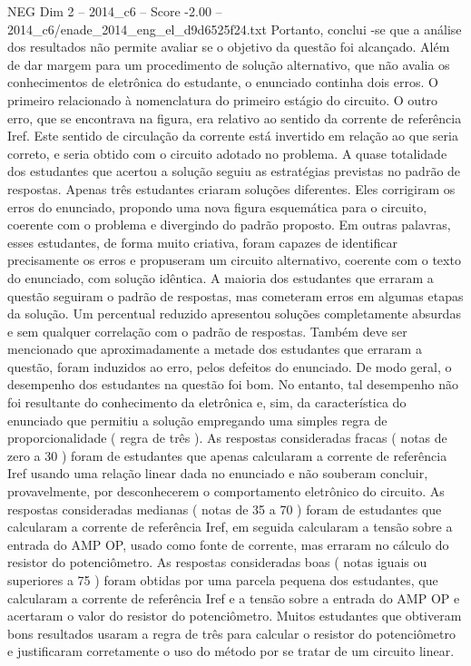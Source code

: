 \begin{textsample}{NEG Dim 2 – 2014\_c6 – Score -2.00 – 2014\_c6/enade\_2014\_eng\_el\_d9d6525f24.txt}
Portanto, conclui -se que a análise dos resultados não permite avaliar se o objetivo da questão foi alcançado.
Além de dar margem para um procedimento de solução alternativo, que não avalia os conhecimentos de eletrônica do estudante, o enunciado continha dois erros.
O primeiro relacionado à nomenclatura do primeiro estágio do circuito.
O outro erro, que se encontrava na figura, era relativo ao sentido da corrente de referência Iref.
Este sentido de circulação da corrente está invertido em relação ao que seria correto, e seria obtido com o circuito adotado no problema.
A quase totalidade dos estudantes que acertou a solução seguiu as estratégias previstas no padrão de respostas.
Apenas três estudantes criaram soluções diferentes.
Eles corrigiram os erros do enunciado, propondo uma nova figura esquemática para o circuito, coerente com o problema e divergindo do padrão proposto.
Em outras palavras, esses estudantes, de forma muito criativa, foram capazes de identificar precisamente os erros e propuseram um circuito alternativo, coerente com o texto do enunciado, com solução idêntica.
A maioria dos estudantes que erraram a questão seguiram o padrão de respostas, mas cometeram erros em algumas etapas da solução.
Um percentual reduzido apresentou soluções completamente absurdas e sem qualquer correlação com o padrão de respostas.
Também deve ser mencionado que aproximadamente a metade dos estudantes que erraram a questão, foram induzidos ao erro, pelos defeitos do enunciado.
De modo geral, o desempenho dos estudantes na questão foi bom.
No entanto, tal desempenho não foi resultante do conhecimento da eletrônica e, sim, da característica do enunciado que permitiu a solução empregando uma simples regra de proporcionalidade ( regra de três ).
As respostas consideradas fracas ( notas de zero a 30 ) foram de estudantes que apenas calcularam a corrente de referência Iref usando uma relação linear dada no enunciado e não souberam concluir, provavelmente, por desconhecerem o comportamento eletrônico do circuito.
As respostas consideradas medianas ( notas de 35 a 70 ) foram de estudantes que calcularam a corrente de referência Iref, em seguida calcularam a tensão sobre a entrada do AMP OP, usado como fonte de corrente, mas erraram no cálculo do resistor do potenciômetro.
As respostas consideradas boas ( notas iguais ou superiores a 75 ) foram obtidas por uma parcela pequena dos estudantes, que calcularam a corrente de referência Iref e a tensão sobre a entrada do AMP OP e acertaram o valor do resistor do potenciômetro.
Muitos estudantes que obtiveram bons resultados usaram a regra de três para calcular o resistor do potenciômetro e justificaram corretamente o uso do método por se tratar de um circuito linear.

\end{textsample}
